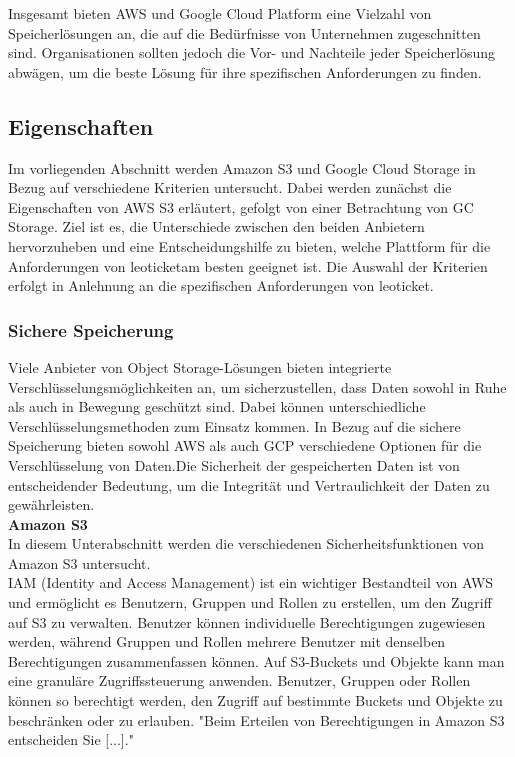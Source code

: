 Insgesamt bieten AWS und Google Cloud Platform eine Vielzahl von Speicherlösungen an, die auf die Bedürfnisse von Unternehmen zugeschnitten sind. Organisationen sollten jedoch die Vor- und Nachteile jeder Speicherlösung abwägen, um die beste Lösung für ihre spezifischen Anforderungen zu finden.

\newpage

\subsection{Eigenschaften}

Im vorliegenden Abschnitt werden Amazon S3 und Google Cloud Storage in Bezug auf verschiedene Kriterien untersucht. Dabei werden zunächst die Eigenschaften von AWS S3 erläutert, gefolgt von einer Betrachtung von GC Storage. Ziel ist es, die Unterschiede zwischen den beiden Anbietern hervorzuheben und eine Entscheidungshilfe zu bieten, welche Plattform für die Anforderungen von \glqq leoticket\grqq am besten geeignet ist. Die Auswahl der Kriterien erfolgt in Anlehnung an die spezifischen Anforderungen von \glqq leoticket\grqq.


\newpage

\subsubsection{Sichere Speicherung}

Viele Anbieter von Object Storage-Lösungen bieten integrierte Verschlüsselungsmöglichkeiten an, um sicherzustellen, dass Daten sowohl in Ruhe als auch in Bewegung geschützt sind. Dabei können unterschiedliche Verschlüsselungsmethoden zum Einsatz kommen. In Bezug auf die sichere Speicherung bieten sowohl AWS als auch GCP verschiedene Optionen für die Verschlüsselung von Daten.Die Sicherheit der gespeicherten Daten ist von entscheidender Bedeutung, um die Integrität und Vertraulichkeit der Daten zu gewährleisten.\\

\textbf{Amazon S3}\\

In diesem Unterabschnitt werden die verschiedenen Sicherheitsfunktionen von Amazon S3 untersucht.\\

IAM (Identity and Access Management) ist ein wichtiger Bestandteil von AWS und ermöglicht es Benutzern, Gruppen und Rollen zu erstellen, um den Zugriff auf S3 zu verwalten. Benutzer können individuelle Berechtigungen zugewiesen werden, während Gruppen und Rollen mehrere Benutzer mit denselben Berechtigungen zusammenfassen können. Auf S3-Buckets und Objekte kann man eine granuläre Zugriffssteuerung anwenden. Benutzer, Gruppen oder Rollen können so berechtigt werden, den Zugriff auf bestimmte Buckets und Objekte zu beschränken oder zu erlauben. "Beim Erteilen von Berechtigungen in Amazon S3 entscheiden Sie [...]."\cite{aws-iam-s3}\\

